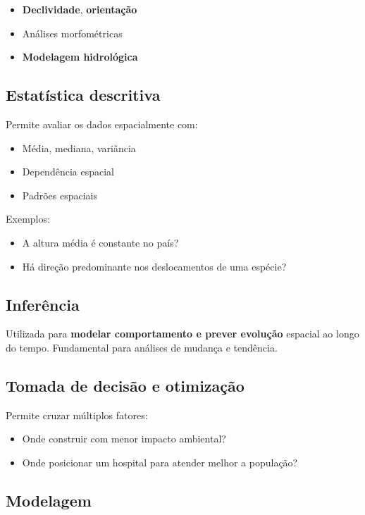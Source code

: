 \begin{itemize}
 \item \textbf{Declividade}, \textbf{orientação}
 \item Análises morfométricas
 \item \textbf{Modelagem hidrológica}
\end{itemize}

\subsection{Estatística descritiva}

Permite avaliar os dados espacialmente com:

\begin{itemize}
 \item Média, mediana, variância
 \item Dependência espacial
 \item Padrões espaciais
\end{itemize}

Exemplos:

\begin{itemize}
 \item A altura média é constante no país?
 \item Há direção predominante nos deslocamentos de uma espécie?
\end{itemize}

\subsection{Inferência}

Utilizada para \textbf{modelar comportamento e prever evolução} espacial ao longo do tempo. Fundamental para análises de mudança e tendência.

\subsection{Tomada de decisão e otimização}

Permite cruzar múltiplos fatores:

\begin{itemize}
 \item Onde construir com menor impacto ambiental?
 \item Onde posicionar um hospital para atender melhor a população?
\end{itemize}

\subsection{Modelagem}

